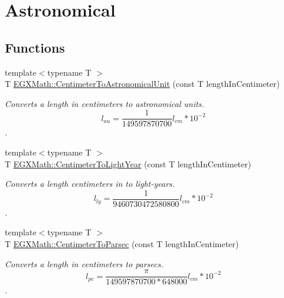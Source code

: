\hypertarget{group___e_g_x_math-_conversions-_length_conversions-_s_i-_centimeter-_astronomical}{}\section{Astronomical}
\label{group___e_g_x_math-_conversions-_length_conversions-_s_i-_centimeter-_astronomical}
\subsection*{Functions}
\begin{DoxyCompactItemize}
\item 
{\footnotesize template$<$typename T $>$ }\\T \mbox{\hyperlink{group___e_g_x_math-_conversions-_length_conversions-_s_i-_centimeter-_astronomical_gaa8152adbb5be9ad80f2495646bbf316d}{E\+G\+X\+Math\+::\+Centimeter\+To\+Astronomical\+Unit}} (const T length\+In\+Centimeter)
\begin{DoxyCompactList}\small\item\em Converts a length in centimeters to astronomical units. \[ l_{au}= \frac{1}{149597870700} l_{cm} * 10^{-2} \]. \end{DoxyCompactList}\item 
{\footnotesize template$<$typename T $>$ }\\T \mbox{\hyperlink{group___e_g_x_math-_conversions-_length_conversions-_s_i-_centimeter-_astronomical_ga99b5eb487ffbb3d89497999b562ea77e}{E\+G\+X\+Math\+::\+Centimeter\+To\+Light\+Year}} (const T length\+In\+Centimeter)
\begin{DoxyCompactList}\small\item\em Converts a length centimeters in to light-\/years. \[ l_{ly}= \frac{1}{9460730472580800} l_{cm} * 10^{-2} \]. \end{DoxyCompactList}\item 
{\footnotesize template$<$typename T $>$ }\\T \mbox{\hyperlink{group___e_g_x_math-_conversions-_length_conversions-_s_i-_centimeter-_astronomical_ga9e28cd6f9d5da2330cd5bf17af20cc8f}{E\+G\+X\+Math\+::\+Centimeter\+To\+Parsec}} (const T length\+In\+Centimeter)
\begin{DoxyCompactList}\small\item\em Converts a length in centimeters to parsecs. \[ l_{pc}=\frac{\pi}{149597870700 * 648000} l_{cm} * 10^{-2} \]. \end{DoxyCompactList}\end{DoxyCompactItemize}


